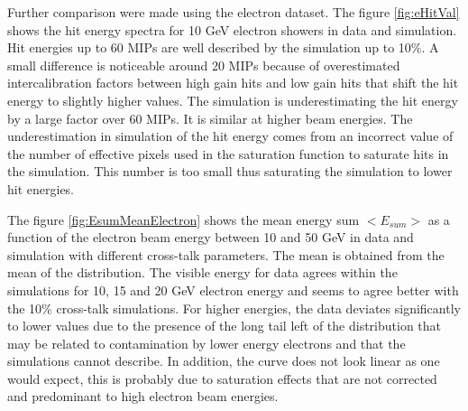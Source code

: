 \documentclass{JINST}
\begin{document}
Further comparison were made using the electron dataset. The figure \ref{fig:eHitVal} shows the hit energy spectra for 10 GeV electron showers in data and simulation. Hit energies up to 60 MIPs are well described by the simulation up to 10\%. A small difference is noticeable around 20 MIPs because of overestimated intercalibration factors between high gain hits and low gain hits that shift the hit energy to slightly higher values. The simulation is underestimating the hit energy by a large factor over 60 MIPs. It is similar at higher beam energies. The underestimation in simulation of the hit energy comes from an incorrect value of the number of effective pixels used in the saturation function to saturate hits in the simulation. This number is too small thus saturating the simulation to lower hit energies.

The figure \ref{fig:EsumMeanElectron} shows the mean energy sum $<E_{sum}>$ as a function of the electron beam energy between 10 and 50 GeV in data and simulation with different cross-talk parameters. The mean is obtained from the mean of the distribution. The visible energy for data agrees within the simulations for 10, 15 and 20 GeV electron energy and seems to agree better with the 10\% cross-talk simulations. For higher energies, the data deviates significantly to lower values due to the presence of the long tail left of the distribution that may be related to contamination by lower energy electrons \cite{AmbraPrivate} and that the simulations cannot describe. In addition, the curve does not look linear as one would expect, this is probably due to saturation effects that are not corrected and predominant to high electron beam energies.
\end{document}
